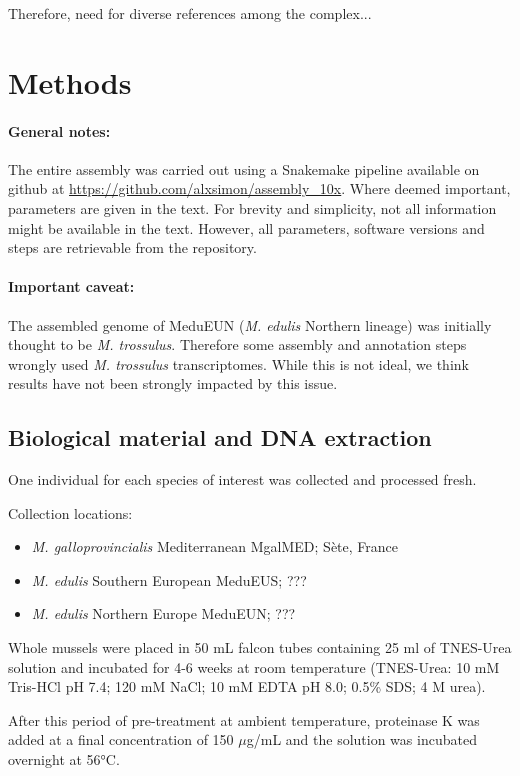 \documentclass[11pt, a4paper]{article}
\begin{document}
Therefore, need for diverse references among the complex...

\section{Methods}\label{methods}

\paragraph{General notes:}
The entire assembly was carried out using a Snakemake \parencite{Molder2021} pipeline available on github at \url{https://github.com/alxsimon/assembly_10x}.
Where deemed important, parameters are given in the text.
For brevity and simplicity, not all information might be available in the text.
However, all parameters, software versions and steps are retrievable from the repository.

\paragraph{Important caveat:}
The assembled genome of MeduEUN (\textit{M. edulis} Northern lineage) was initially thought to be \textit{M. trossulus}.
Therefore some assembly and annotation steps wrongly used \textit{M. trossulus} transcriptomes.
While this is not ideal, we think results have not been strongly impacted by this issue.


\subsection{Biological material and DNA extraction}

One individual for each species of interest was collected and processed fresh.

Collection locations:
\begin{itemize}
	\item \emph{M. galloprovincialis} Mediterranean MgalMED; Sète, France
	\item \emph{M. edulis} Southern European MeduEUS; ???
	\item \emph{M. edulis} Northern Europe MeduEUN; ???
\end{itemize}

Whole mussels were placed in 50 mL falcon tubes containing 25 ml of TNES-Urea solution and incubated for 4-6 weeks at room temperature (TNES-Urea: 10 mM Tris-HCl pH 7.4; 120 mM NaCl; 10 mM EDTA pH 8.0; 0.5\% SDS; 4 M urea).

After this period of pre-treatment at ambient temperature, proteinase K was added at a final concentration of 150 \(\mu\)g/mL and the solution was incubated overnight at 56°C.
\end{document}
